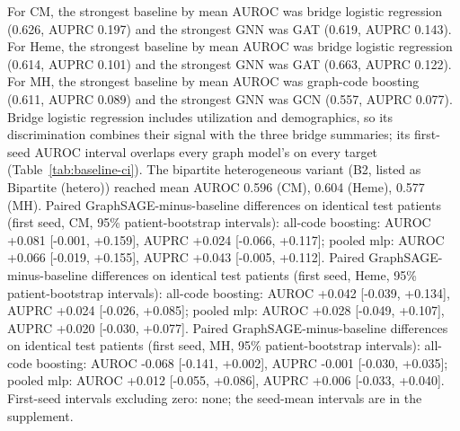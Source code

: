 For CM, the strongest baseline by mean AUROC was bridge logistic regression (0.626, AUPRC 0.197) and the strongest GNN was GAT (0.619, AUPRC 0.143). For Heme, the strongest baseline by mean AUROC was bridge logistic regression (0.614, AUPRC 0.101) and the strongest GNN was GAT (0.663, AUPRC 0.122). For MH, the strongest baseline by mean AUROC was graph-code boosting (0.611, AUPRC 0.089) and the strongest GNN was GCN (0.557, AUPRC 0.077). Bridge logistic regression includes utilization and demographics, so its discrimination combines their signal with the three bridge summaries; its first-seed AUROC interval overlaps every graph model's on every target (Table~\ref{tab:baseline-ci}). The bipartite heterogeneous variant (B2, listed as Bipartite (hetero)) reached mean AUROC 0.596 (CM), 0.604 (Heme), 0.577 (MH). Paired GraphSAGE-minus-baseline differences on identical test patients (first seed, CM, 95\% patient-bootstrap intervals): all-code boosting: AUROC +0.081 [-0.001, +0.159], AUPRC +0.024 [-0.066, +0.117]; pooled mlp: AUROC +0.066 [-0.019, +0.155], AUPRC +0.043 [-0.005, +0.112]. Paired GraphSAGE-minus-baseline differences on identical test patients (first seed, Heme, 95\% patient-bootstrap intervals): all-code boosting: AUROC +0.042 [-0.039, +0.134], AUPRC +0.024 [-0.026, +0.085]; pooled mlp: AUROC +0.028 [-0.049, +0.107], AUPRC +0.020 [-0.030, +0.077]. Paired GraphSAGE-minus-baseline differences on identical test patients (first seed, MH, 95\% patient-bootstrap intervals): all-code boosting: AUROC -0.068 [-0.141, +0.002], AUPRC -0.001 [-0.030, +0.035]; pooled mlp: AUROC +0.012 [-0.055, +0.086], AUPRC +0.006 [-0.033, +0.040]. First-seed intervals excluding zero: none; the seed-mean intervals are in the supplement.
